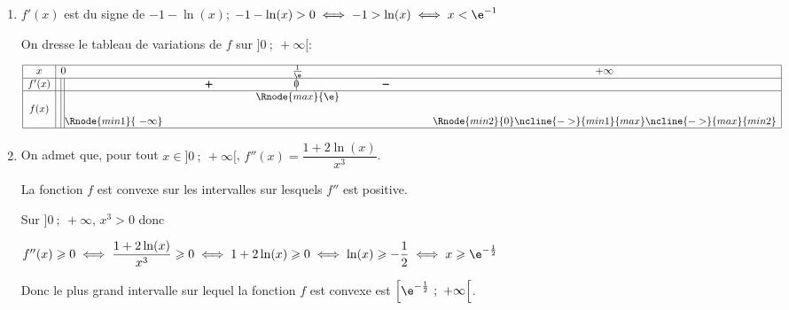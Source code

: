 \begin{enumerate}
\item $f'(x)$ est du signe de $-1-\ln(x)$;
$-1-\ln(x) >0 \iff -1 > \ln(x) \iff x < \e^{-1}$

On dresse le tableau de variations de $f$ sur $]0~;~+\infty[$:

\begin{center}
{\renewcommand{\arraystretch}{1.3}
\def\esp{\hspace*{2.5cm}}%
\def\hauteur{0pt}%
$\begin{array}{|c|l *4{c}|}
\hline
x & 0  & \esp & \frac{1}{\e} & \esp & +\infty \\ 
\hline
f'(x) &\vline\;\vline  &   \pmb{+} & \vline\hspace{-2.7pt}0 & \pmb{-} & \\ 
\hline
 & \vline\;\vline &  &   \Rnode{max}{\e}  &  &   \\  
f(x) &\vline\;\vline &     &  &  &  \rule{0pt}{\hauteur} \\ 
 & \vline\;\vline \Rnode{min1}{~-\infty} &   &  &  &   \Rnode{min2}{0} \rule{0pt}{\hauteur}    
 \ncline{->}{min1}{max} 
 \ncline{->}{max}{min2} 
 \\ 
\hline
\end{array} $
}
\end{center}	

\item %
On admet que, pour tout $x\in]0~;~+\infty[$, $f''(x)=\dfrac{1+2\ln(x)}{x^3} $.


La fonction $f$ est convexe sur les intervalles sur lesquels $f''$ est positive.

Sur $]0~;~+\infty$, $x^3>0$ donc

$f''(x)\geqslant 0
\iff \dfrac{1+2\ln(x)}{x^3} \geqslant 0
\iff 1+2\ln(x) \geqslant 0
\iff \ln(x) \geqslant -\dfrac{1}{2}
\iff x\geqslant \e^{-\frac{1}{2}}$

Donc le plus grand intervalle sur lequel la fonction $f$ est convexe est $\left [\e^{-\frac{1}{2}}~;~+\infty \right [$.
\end{enumerate}


